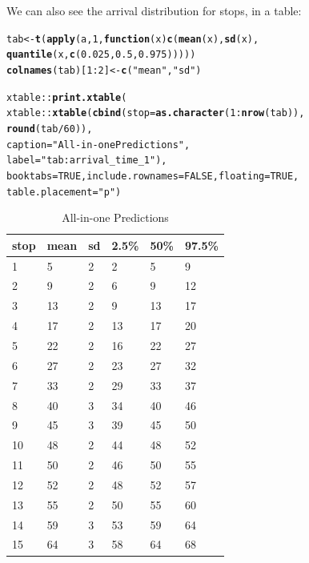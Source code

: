 \documentclass[11pt]{article}\usepackage[]{graphicx}\usepackage[]{color}
\makeatletter
\newcommand{\hlnum}[1]{\textcolor[rgb]{0.686,0.059,0.569}{#1}}%
\newcommand{\hlstr}[1]{\textcolor[rgb]{0.192,0.494,0.8}{#1}}%
\newcommand{\hlopt}[1]{\textcolor[rgb]{0,0,0}{#1}}%
\newcommand{\hlstd}[1]{\textcolor[rgb]{0.345,0.345,0.345}{#1}}%
\newcommand{\hlkwa}[1]{\textcolor[rgb]{0.161,0.373,0.58}{\textbf{#1}}}%
\newcommand{\hlkwb}[1]{\textcolor[rgb]{0.69,0.353,0.396}{#1}}%
\newcommand{\hlkwc}[1]{\textcolor[rgb]{0.333,0.667,0.333}{#1}}%
\newcommand{\hlkwd}[1]{\textcolor[rgb]{0.737,0.353,0.396}{\textbf{#1}}}%
\newenvironment{kframe}{%
 \def\at@end@of@kframe{}%
 \ifinner\ifhmode%
  \def\at@end@of@kframe{\end{minipage}}%
  \begin{minipage}{\columnwidth}%
 \fi\fi%
 \def\FrameCommand##1{\hskip\@totalleftmargin \hskip-\fboxsep
 \colorbox{shadecolor}{##1}\hskip-\fboxsep
     \hskip-\linewidth \hskip-\@totalleftmargin \hskip\columnwidth}%
 \MakeFramed {\advance\hsize-\width
   \@totalleftmargin\z@ \linewidth\hsize
   \@setminipage}}%
 {\par\unskip\endMakeFramed%
 \at@end@of@kframe}
\makeatother
\begin{document}
We can also see the arrival distribution for stops, in a table:
\begin{kframe}
\begin{alltt}
\hlstd{tab} \hlkwb{<-} \hlkwd{t}\hlstd{(}\hlkwd{apply}\hlstd{(a,} \hlnum{1}\hlstd{,} \hlkwa{function}\hlstd{(}\hlkwc{x}\hlstd{)} \hlkwd{c}\hlstd{(}\hlkwd{mean}\hlstd{(x),} \hlkwd{sd}\hlstd{(x),}
                                   \hlkwd{quantile}\hlstd{(x,} \hlkwd{c}\hlstd{(}\hlnum{0.025}\hlstd{,} \hlnum{0.5}\hlstd{,} \hlnum{0.975}\hlstd{)))))}
\hlkwd{colnames}\hlstd{(tab)[}\hlnum{1}\hlopt{:}\hlnum{2}\hlstd{]} \hlkwb{<-} \hlkwd{c}\hlstd{(}\hlstr{"mean"}\hlstd{,} \hlstr{"sd"}\hlstd{)}

\hlstd{xtable}\hlopt{::}\hlkwd{print.xtable}\hlstd{(}
    \hlstd{xtable}\hlopt{::}\hlkwd{xtable}\hlstd{(}\hlkwd{cbind}\hlstd{(}\hlkwc{stop} \hlstd{=} \hlkwd{as.character}\hlstd{(}\hlnum{1}\hlopt{:}\hlkwd{nrow}\hlstd{(tab)),}
                         \hlkwd{round}\hlstd{(tab} \hlopt{/} \hlnum{60}\hlstd{)),}
                   \hlkwc{caption} \hlstd{=} \hlstr{"All-in-one Predictions"}\hlstd{,}
                   \hlkwc{label} \hlstd{=} \hlstr{"tab:arrival_time_1"}\hlstd{),}
    \hlkwc{booktabs} \hlstd{=} \hlnum{TRUE}\hlstd{,} \hlkwc{include.rownames} \hlstd{=} \hlnum{FALSE}\hlstd{,} \hlkwc{floating} \hlstd{=} \hlnum{TRUE}\hlstd{,}
    \hlkwc{table.placement} \hlstd{=} \hlstr{"p"}\hlstd{)}
\end{alltt}
\end{kframe}%
\begin{table}[p]
\centering
\begin{tabular}{llllll}
  \toprule
stop & mean & sd & 2.5\% & 50\% & 97.5\% \\ 
  \midrule
1 & 5 & 2 & 2 & 5 & 9 \\ 
  2 & 9 & 2 & 6 & 9 & 12 \\ 
  3 & 13 & 2 & 9 & 13 & 17 \\ 
  4 & 17 & 2 & 13 & 17 & 20 \\ 
  5 & 22 & 2 & 16 & 22 & 27 \\ 
  6 & 27 & 2 & 23 & 27 & 32 \\ 
  7 & 33 & 2 & 29 & 33 & 37 \\ 
  8 & 40 & 3 & 34 & 40 & 46 \\ 
  9 & 45 & 3 & 39 & 45 & 50 \\ 
  10 & 48 & 2 & 44 & 48 & 52 \\ 
  11 & 50 & 2 & 46 & 50 & 55 \\ 
  12 & 52 & 2 & 48 & 52 & 57 \\ 
  13 & 55 & 2 & 50 & 55 & 60 \\ 
  14 & 59 & 3 & 53 & 59 & 64 \\ 
  15 & 64 & 3 & 58 & 64 & 68 \\ 
   \bottomrule
\end{tabular}
\caption{All-in-one Predictions} 
\label{tab:arrival_time_1}
\end{table}
\end{document}
